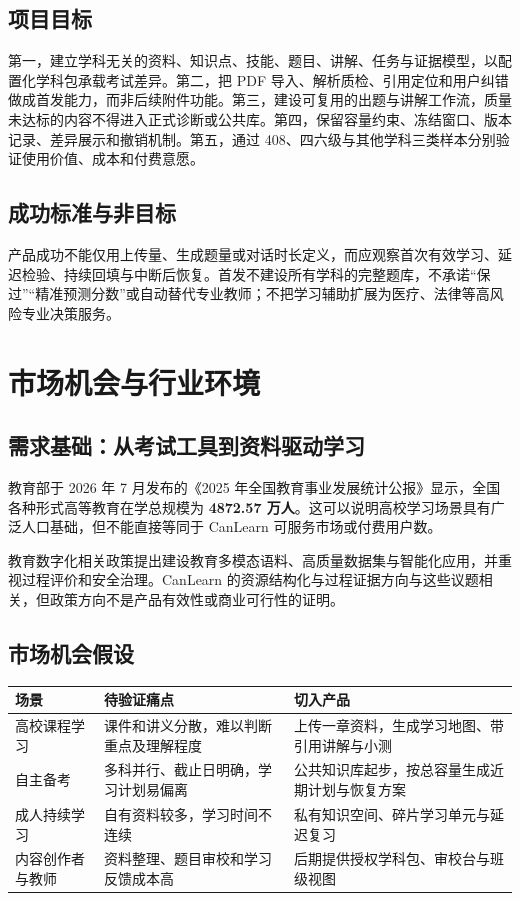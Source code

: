 \documentclass[UTF8,a4paper,11pt,fontset=none]{ctexart}
\newcommand{\cth}[1]{\textbf{\sffamily #1}}
\newcommand{\newsec}[1]{\clearpage\section{#1}}
\newenvironment{tbl}{\par\vspace{3pt}\small\noindent\ignorespaces}{\unskip\par\vspace{5pt}}
\begin{document}
\subsection{项目目标}
第一，建立学科无关的资料、知识点、技能、题目、讲解、任务与证据模型，以配置化学科包承载考试差异。第二，把 PDF 导入、解析质检、引用定位和用户纠错做成首发能力，而非后续附件功能。第三，建设可复用的出题与讲解工作流，质量未达标的内容不得进入正式诊断或公共库。第四，保留容量约束、冻结窗口、版本记录、差异展示和撤销机制。第五，通过 408、四六级与其他学科三类样本分别验证使用价值、成本和付费意愿。

\subsection{成功标准与非目标}
产品成功不能仅用上传量、生成题量或对话时长定义，而应观察首次有效学习、延迟检验、持续回填与中断后恢复。首发不建设所有学科的完整题库，不承诺“保过”“精准预测分数”或自动替代专业教师；不把学习辅助扩展为医疗、法律等高风险专业决策服务。

\newsec{市场机会与行业环境}
\subsection{需求基础：从考试工具到资料驱动学习}
教育部于 2026 年 7 月发布的《2025 年全国教育事业发展统计公报》显示，全国各种形式高等教育在学总规模为 \textbf{4872.57 万人}。这可以说明高校学习场景具有广泛人口基础，但不能直接等同于 CanLearn 可服务市场或付费用户数。\cite{moe2025}

教育数字化相关政策提出建设教育多模态语料、高质量数据集与智能化应用，并重视过程评价和安全治理。CanLearn 的资源结构化与过程证据方向与这些议题相关，但政策方向不是产品有效性或商业可行性的证明。\cite{digital}

\subsection{市场机会假设}
\begin{tbl}
\begin{tabularx}{\linewidth}{@{}L{28mm}YY@{}}
\toprule
\cth{场景}&\cth{待验证痛点}&\cth{切入产品}\\\midrule
高校课程学习&课件和讲义分散，难以判断重点及理解程度&上传一章资料，生成学习地图、带引用讲解与小测\\
自主备考&多科并行、截止日明确，学习计划易偏离&公共知识库起步，按总容量生成近期计划与恢复方案\\
成人持续学习&自有资料较多，学习时间不连续&私有知识空间、碎片学习单元与延迟复习\\
内容创作者与教师&资料整理、题目审校和学习反馈成本高&后期提供授权学科包、审校台与班级视图\\
\bottomrule
\end{tabularx}
\end{tbl}
\end{document}
